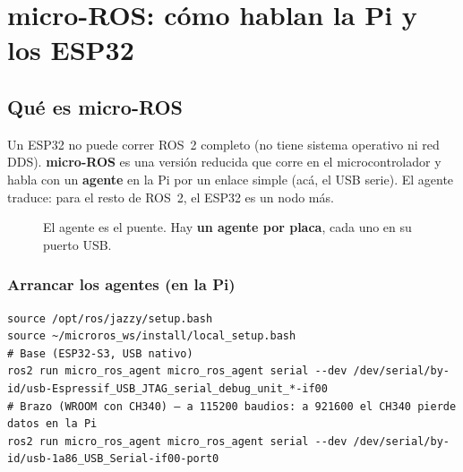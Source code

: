\chapter{micro-ROS: cómo hablan la Pi y los ESP32}\label{cap:microros}

\section{Qué es micro-ROS}

Un ESP32 no puede correr ROS~2 completo (no tiene sistema operativo ni red DDS). \textbf{micro-ROS} es una versión
reducida que corre en el microcontrolador y habla con un \textbf{agente} en la Pi por un enlace simple (acá, el USB
serie). El agente traduce: para el resto de ROS~2, el ESP32 es un nodo más.

\begin{figure}[H]
\centering
{}
\caption{El agente es el puente. Hay \textbf{un agente por placa}, cada uno en su puerto USB.}
\end{figure}

\subsection{Arrancar los agentes (en la Pi)}
\begin{lstlisting}[language=consola]
source /opt/ros/jazzy/setup.bash
source ~/microros_ws/install/local_setup.bash
# Base (ESP32-S3, USB nativo)
ros2 run micro_ros_agent micro_ros_agent serial --dev /dev/serial/by-id/usb-Espressif_USB_JTAG_serial_debug_unit_*-if00
# Brazo (WROOM con CH340) — a 115200 baudios: a 921600 el CH340 pierde datos en la Pi
ros2 run micro_ros_agent micro_ros_agent serial --dev /dev/serial/by-id/usb-1a86_USB_Serial-if00-port0
\end{lstlisting}

